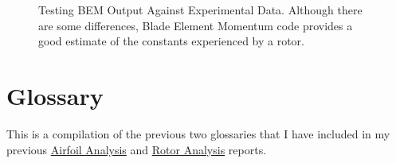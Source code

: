 \documentclass{article}
\begin{document}
\begin{figure}
  \centering

  \hspace{1em}
  \caption{Testing BEM Output Against Experimental Data. \newline Although there are some differences, Blade Element Momentum code provides a good estimate of the constants experienced by a rotor.}
  \label{fig:2}
\end{figure}

\clearpage

\section{Glossary}

This is a compilation of the previous two glossaries that I have included in my previous \href{https://github.com/JoeSpencer1/497R-Projects/blob/Rotor-Analysis/Airfoil Analysis/Airfoil_Analysis.pdf}{Airfoil Analysis} and \href{https://github.com/JoeSpencer1/497R-Projects/blob/Rotor-Analysis/Rotor Analysis/Rotor_Analysis.pdf}{Rotor Analysis} reports.
\end{document}
